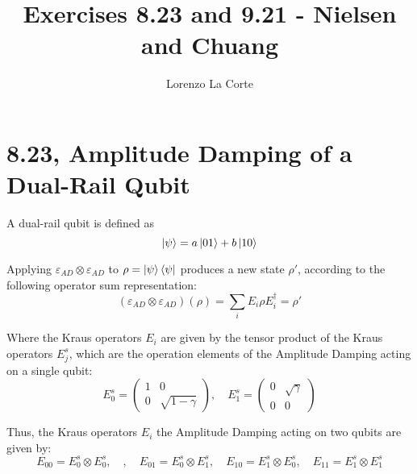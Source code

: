 \documentclass{masterthesis}
\begin{document}
\title{Exercises 8.23 and 9.21 - Nielsen and Chuang}

\author{Lorenzo La Corte}

\advisor{}

\examiner{}

\maketitle

\section*{8.23, Amplitude Damping of a Dual-Rail Qubit}

A dual-rail qubit is defined as
\begin{equation}
    \ket{\psi}=a\ket{01}+b\ket{10}
\end{equation}

Applying $\varepsilon_{A D} \otimes \varepsilon_{A D}$ to $\rho=\ket{\psi}\bra{\psi}$ produces a new state $\rho'$, according to the following operator sum representation:
\begin{equation}
    (\varepsilon_{A D} \otimes \varepsilon_{A D})(\rho) = \sum_{i} E_{i} \rho E_{i}^{\dagger} = \rho'
\end{equation}

Where the Kraus operators $E_{i}$ are given by the tensor product of the Kraus operators $E_{j}^{s}$, which are the operation elements of the Amplitude Damping acting on a single qubit:
\begin{equation}
    E_{0}^{s} = \begin{pmatrix} 1 & 0 \\ 0 & \sqrt{1-\gamma} \end{pmatrix}, \quad E_{1}^{s} = \begin{pmatrix} 0 & \sqrt{\gamma} \\ 0 & 0 \end{pmatrix}
\end{equation}

Thus, the Kraus operators $E_{i}$ the Amplitude Damping acting on two qubits are given by:
\begin{equation}
    E_{00} = E_{0}^{s} \otimes E_{0}^{s}, \quad , \quad E_{01} = E_{0}^{s} \otimes E_{1}^{s}, \quad E_{10} = E_{1}^{s} \otimes E_{0}^{s}, \quad E_{11} = E_{1}^{s} \otimes E_{1}^{s}
\end{equation}
\end{document}
